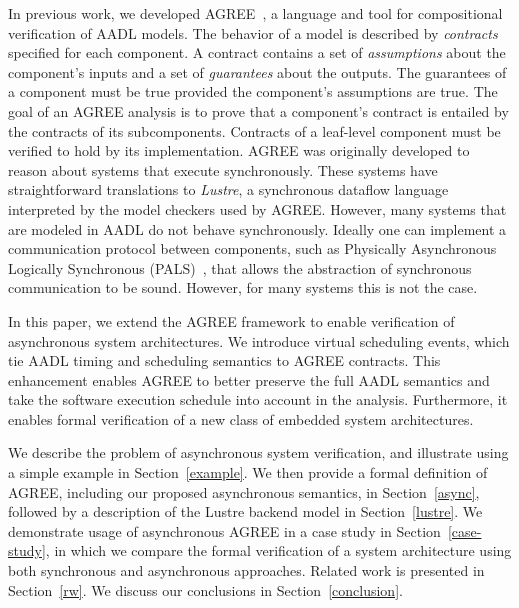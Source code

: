 In previous work, we developed AGREE~\cite{8625938}, a language and tool for compositional verification of AADL models.  The behavior of a model is described by \textit{contracts} specified for each component.  A contract contains a set of \textit{assumptions} about the component's inputs and a set of \textit{guarantees} about the outputs.  The guarantees of a component must be true provided the component's assumptions are true.  The goal of an AGREE analysis is to prove that a component's contract is entailed by the contracts of its subcomponents.  Contracts of a leaf-level component must be verified to hold by its implementation.  
%
AGREE was originally developed to reason about systems that execute synchronously. These systems have straightforward translations to \emph{Lustre}, a synchronous dataflow language interpreted by the model checkers used by AGREE. However, many systems that are modeled in AADL do not behave synchronously. Ideally one can implement a communication protocol between components, such as Physically Asynchronous Logically Synchronous (PALS)~\cite{pals}, that allows the abstraction of synchronous communication to be sound. However, for many systems this is not the case.

In this paper, we extend the AGREE framework to enable verification of asynchronous system architectures. We introduce virtual scheduling events, which tie AADL timing and scheduling semantics to AGREE contracts. This enhancement enables AGREE to better preserve the full AADL semantics and take the software execution schedule into account in the analysis.  Furthermore, it enables formal verification of a new class of embedded system architectures. 

We describe the problem of asynchronous system verification, and illustrate using a simple example in Section~\ref{example}.  We then provide a formal definition of AGREE, including our proposed asynchronous semantics, in Section~\ref{async}, followed by a description of the Lustre backend model in Section~\ref{lustre}.  We demonstrate usage of asynchronous AGREE in a case study in Section~\ref{case-study}, in which we compare the formal verification of a system architecture using both synchronous and asynchronous approaches.  Related work is presented in Section~\ref{rw}.  We discuss our conclusions in Section~\ref{conclusion}.  
